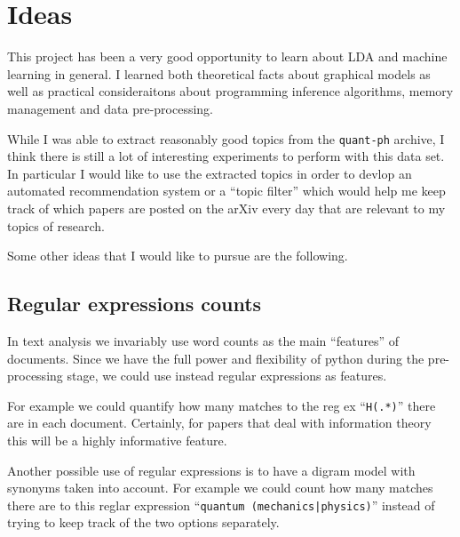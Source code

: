 \documentclass[11pt]{article}
\begin{document}
	
\section{Ideas}

    This project has been a very good opportunity to learn about LDA and machine learning in
    general.
    I learned both theoretical facts about graphical models as well as practical consideraitons
    about programming inference algorithms, memory management and data pre-processing.

    While I was able to extract reasonably good topics from the \texttt{quant-ph} archive,
    I think there is still a lot of interesting experiments to perform with this data set.
    In particular I would like to use the extracted topics in order to devlop an automated
    recommendation system or a ``topic filter'' which would help me keep track of which papers
    are posted on the arXiv every day that are relevant to my topics of research.

    Some other ideas that I would like to pursue are the following.

	\subsection{Regular expressions counts}
        
        In text analysis we invariably use word counts as the main ``features'' of documents.
        Since we have the full power and flexibility of python during the pre-processing stage,
        we could use instead regular expressions as features.

        For example we could quantify how many matches to the reg ex ``\texttt{H(.*)}'' there are
        in each document. Certainly, for papers that deal with information theory this will be 
        a highly informative feature.

        Another possible use of regular expressions is to have a digram model with synonyms
        taken into account. For example we could count how many matches there are to this
        reglar expression ``\texttt{quantum (mechanics|physics)}'' instead of trying to keep
        track of the two options separately.
		
\end{document}
